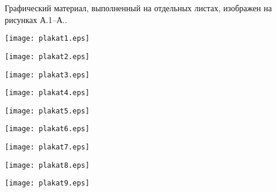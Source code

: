 
Графический материал, выполненный на отдельных листах,
изображен на рисунках А.1--А..
\setcounter{числоПлакатов}{0}

\renewcommand{\thefigure}{А.\arabic{figure}} %

\begin{landscape}

\begin{плакат}
    \texttt{[image: plakat1.eps]}
    \label{pl1:image}      
\end{плакат}

\begin{плакат}
    \texttt{[image: plakat2.eps]}
    \label{pl2:image}      
\end{плакат}

\begin{плакат}
    \texttt{[image: plakat3.eps]}
    \label{pl3:image}      
\end{плакат}

\begin{плакат}
    \texttt{[image: plakat4.eps]}
    \label{pl4:image}      
\end{плакат}

\begin{плакат}
	\texttt{[image: plakat5.eps]}
	\label{pl5:image}      
\end{плакат}

\begin{плакат}
	\texttt{[image: plakat6.eps]}
	\label{pl6:image}      
\end{плакат}

\begin{плакат}
	\texttt{[image: plakat7.eps]}
	\label{pl7:image}      
\end{плакат}

\begin{плакат}
	\texttt{[image: plakat8.eps]}
	\label{pl8:image}      
\end{плакат}

\begin{плакат}
	\texttt{[image: plakat9.eps]}
	\label{pl9:image}      
\end{плакат}

\end{landscape}
